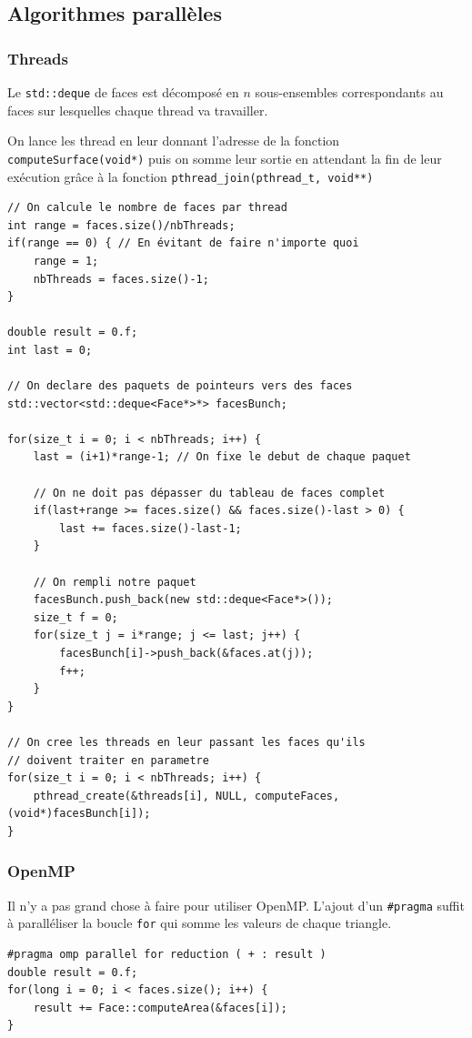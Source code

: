 \documentclass[a4paper]{article}
\begin{document}
	\subsection{Algorithmes parallèles}
		\subsubsection{Threads}
		Le \texttt{std::deque} de faces est décomposé en $n$ sous-ensembles correspondants au faces sur lesquelles chaque thread va travailler.

		On lance les thread en leur donnant l'adresse de la fonction \texttt{computeSurface(void*)} puis on somme leur sortie en attendant la fin de leur exécution grâce à la fonction \texttt{pthread\_join(pthread\_t, void**)}
		\begin{lstlisting}
// On calcule le nombre de faces par thread
int range = faces.size()/nbThreads;
if(range == 0) { // En évitant de faire n'importe quoi
	range = 1;
	nbThreads = faces.size()-1;
}

double result = 0.f;
int last = 0;

// On declare des paquets de pointeurs vers des faces
std::vector<std::deque<Face*>*> facesBunch;

for(size_t i = 0; i < nbThreads; i++) {
    last = (i+1)*range-1; // On fixe le debut de chaque paquet

	// On ne doit pas dépasser du tableau de faces complet
    if(last+range >= faces.size() && faces.size()-last > 0) {
        last += faces.size()-last-1;
    }

	// On rempli notre paquet
    facesBunch.push_back(new std::deque<Face*>());
    size_t f = 0;
    for(size_t j = i*range; j <= last; j++) {
        facesBunch[i]->push_back(&faces.at(j));
        f++;
    }
}

// On cree les threads en leur passant les faces qu'ils
// doivent traiter en parametre
for(size_t i = 0; i < nbThreads; i++) {
    pthread_create(&threads[i], NULL, computeFaces, (void*)facesBunch[i]);
}
		\end{lstlisting}

		\subsubsection{OpenMP}
		Il n'y a pas grand chose à faire pour utiliser OpenMP. L'ajout d'un \texttt{\#pragma} suffit à paralléliser la boucle \texttt{for} qui somme les valeurs de chaque triangle.
		\begin{lstlisting}
#pragma omp parallel for reduction ( + : result )
double result = 0.f;
for(long i = 0; i < faces.size(); i++) {
    result += Face::computeArea(&faces[i]);
}
		\end{lstlisting}
\newpage
\end{document}

